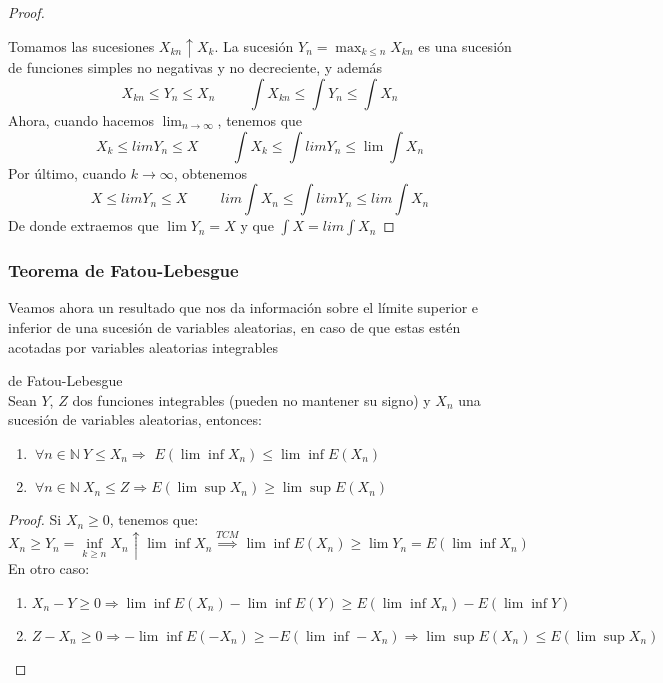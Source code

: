 \begin{proof}
\

Tomamos las sucesiones $X_{kn} \uparrow X_k$. La sucesión $Y_n = \displaystyle \max_{k \leq n} X_{kn}$ es una sucesión de funciones simples no negativas y no decreciente, y además
$$X_{kn} \leq Y_n \leq X_n 
\hspace{1cm}
\int X_{kn} \leq \int Y_n \leq \int X_n$$
Ahora, cuando hacemos $\lim_{n \rightarrow \infty}$, tenemos que
$$X_k \leq lim Y_n \leq X 
\hspace{1cm}
\int X_k \leq \int lim Y_n \leq \lim \int X_n$$
Por último, cuando $k \rightarrow \infty$, obtenemos
$$X \leq lim Y_n \leq X 
\hspace{1cm}
lim \int X_n \leq \int lim Y_n \leq lim \int X_n$$
De donde extraemos que $\lim Y_n = X$ y que $\displaystyle \int X = lim \int X_n$


\end{proof}

\subsubsection{Teorema de Fatou-Lebesgue}
Veamos ahora un resultado que nos da información sobre el límite superior e inferior de una sucesión de variables aleatorias, en caso de que estas estén acotadas por variables aleatorias integrables

\begin{theorem}
de Fatou-Lebesgue\\

Sean $Y$, $Z$ dos funciones integrables (pueden no mantener su signo) y $X_n$ una sucesión de variables aleatorias, entonces:
\begin{enumerate}
\item $\ \forall n\in\mathbb{N} \ Y \leq X_n \Longrightarrow$ $E(\lim \inf X_n) \leq \lim \inf E(X_n)$
\item $\ \forall n\in\mathbb{N}\ X_n \leq Z \Longrightarrow E(\lim \sup X_n)\geq \lim \sup E(X_n)$
\end{enumerate}
\end{theorem}

\begin{proof}
Si $X_n \geq 0$, tenemos que:
$$ X_n \geq Y_n = \inf_{k \geq n} X_n \uparrow \lim \inf X_n \stackrel{TCM}{\implies} \lim \inf E(X_n) \geq \lim Y_n = E(\lim \inf X_n)$$
En otro caso:
\begin{enumerate}
\item $X_n - Y \geq 0 \Rightarrow \lim \inf E(X_n) - \lim \inf E(Y) \geq E(\lim \inf X_n) - E(\lim \inf Y)$
\item $Z - X_n \geq 0 \Rightarrow - \lim \inf E(-X_n) \geq - E(\lim \inf - X_n) \Rightarrow \lim \sup E(X_n) \leq E(\lim \sup X_n)$
\end{enumerate}

\end{proof}


